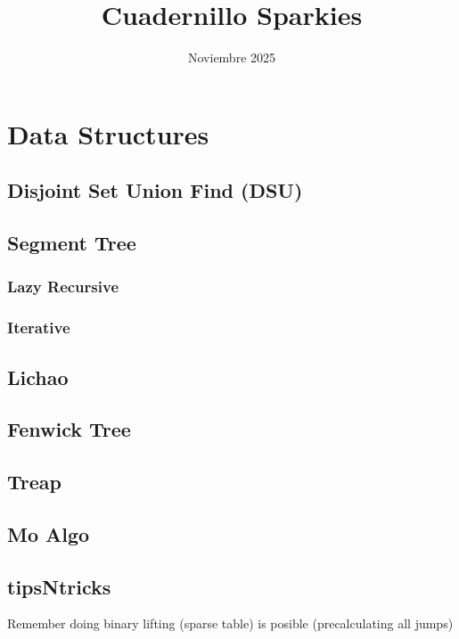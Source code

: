 \documentclass[landscape, 9pt, a4paper, oneside, twocolumn]{extarticle}
\title{Cuadernillo Sparkies}
\date{Noviembre 2025}
\begin{document}
\maketitle
\tableofcontents


\section{Data Structures}
	
	\subsection{Disjoint Set Union Find (DSU)}
	
	\subsection{Segment Tree}
	\subsubsection{Lazy Recursive}
	
	\subsubsection{Iterative}
	
	\subsection{Lichao}
	
	\subsection{Fenwick Tree}
	
	\subsection{Treap}
	
	\subsection{Mo Algo}
	
	\subsection{tipsNtricks} 
	Remember doing binary lifting (sparse table) is posible (precalculating all jumps)
	
\end{document}
